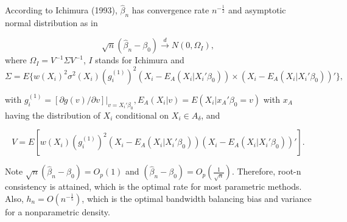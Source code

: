 \documentclass[a4paper]{article}
\begin{document}
\begin{theorem}
According to Ichimura (1993), $\hat{\beta}_{n}$ has convergence rate $n^{-\frac{1}{2}}$ and asymptotic normal distribution as in

	


\[ \sqrt{n}(\hat{\beta}_n - \beta_0) \stackrel{d}{\rightarrow} N(0,\Omega_I), \] where $\Omega_I = V^{-1}\Sigma V^{-1}$, $I$ stands for Ichimura
and 
\[\Sigma = E\{w(X_i)^2\sigma^2(X_i)(g_i^{(1)})^2(X_i - E_A(X_i|X_i'\beta_0)) \times (X_i - E_A(X_i|X_i'\beta_0))'\},\]

with $g_i^{(1)} = [\partial g(v)/\partial v]|_{v = X_i'\beta_0}, E_A(X_i|v) = E(X_i|x_A'\beta_0 = v)$ with $x_A$ having the distribution of $X_i$ conditional on $X_i \in A_\delta$, and

\[ V = E[w(X_i)(g_i^{(1)})^2(X_i - E_A(X_i|X_i'\beta_0))(X_i - E_A(X_i|X_i'\beta_0))'].\]

\end{theorem}

Note $\sqrt{n}(\hat{\beta}_n - \beta_0)=O_p(1)$ and $(\hat{\beta}_n - \beta_0) = O_p\left(\frac{1}{\sqrt{n}}\right)$. Therefore, root-n consistency is attained, which is the optimal rate for most parametric methods. Also, $h_n = O(n^{-\frac{1}{5}})$, which is the optimal bandwidth balancing bias and variance for a  nonparametric density.
\end{document}
